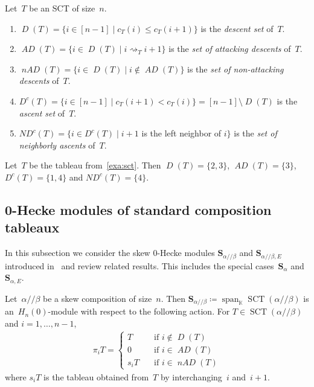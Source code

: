 \documentclass[ALCO,ThmDefs,Unicode,epreuves]{cedram}
\newcommand{\bs}[1]{\boldsymbol{#1} }
\newcommand{\K}{\mathbb K}
\newcommand{\D}{\operatorname{\mathit{D}}}
\newcommand{\DC}{\operatorname{\mathit{D^c}}}
\newcommand{\AD}{\operatorname{\mathit{AD}}}
\newcommand{\nAD}{\operatorname{\mathit{nAD}}}
\newcommand{\ND}{\operatorname{\mathit{ND^c}}}
\DeclareMathOperator{\SCT}{SCT}
\newcommand{\myif}{\quad \text {if }}
\newcommand{\spa}{\operatorname{span}}
\newcommand{\He}{H_n(0)}
\newcommand{\ab}{{\alpha / \! \! / \beta}}
\newcommand{\att}{\rightsquigarrow}
\newcommand{\sa}{\bs S_{\alpha}}
\newcommand{\sab}{\bs S_{\ab}}
\newcommand{\se}{\bs S_{\alpha,E}}
\newcommand{\sse}{\bs S_{\ab,E}}
\begin{document}
\begin{defi}
	\label{thm:descents}
	 Let~$T$ be an SCT of size~$n$.
	\begin{enumerate}
		\item $\D(T) = \{i\in [n-1] \mid c_T(i) \leq c_T(i+1)\}$ is the \emph{descent set} of~$T$.
		\item $\AD(T) = \{i\in \D(T) \mid i\att_T i+1 \}$ is the \emph{set of attacking descents} of~$T$.
		\item $\nAD(T) = \{i\in \D(T) \mid i \notin \AD(T) \}$ is the \emph{set of non-attacking descents} of~$T$.
		\item[(1$'$)] $\DC(T) = \{i\in [n-1] \mid c_T(i+1) < c_T(i)\} = [n-1]\setminus \D(T)$ is the \emph{ascent set} of~$T$.
		\item[(2$'$)] $\ND(T) = \{i\in \DC(T) \mid i+1$ is the left neighbor of $i\}$ is the \emph{set of neighborly ascents} of~$T$.
	\end{enumerate}
\end{defi}

\begin{exam}
Let~$T$ be the tableau from~\cref{exa:sct}. Then
	$\D(T) = \{2,3\}$, 
	$\AD(T) = \{3\}$, 
	$\DC(T) =\{1,4\}$ and
	$\ND(T) = \{4\}$. 
\end{exam}


\subsection{0-Hecke modules of standard composition tableaux}

In this subsection we consider the skew 0-Hecke modules $\sab$ and $\sse$ introduced in~\cite{Tewari2015} and review related results. This includes the special cases~$\sa$ and~$\se$.

\begin{thm}
	\label{thm:sct_modules}
	Let~$\ab$ be a skew composition of size~$n$. 
	Then $\sab\coloneqq \spa_\K \SCT(\ab)$ is an~$\He$-module with respect to the following action. For $T\in \SCT(\ab)$ and $i=1,\dots, n-1$,
	\begin{align*}
	\pi_i T = 
	\begin{cases}
	T &\myif i \notin \D(T) \\
	0 &\myif i \in \AD(T) \\ 
	s_iT &\myif i \in \nAD(T) 
	\end{cases}
	\end{align*}
	where $s_iT$ is the tableau obtained from~$T$ by interchanging~$i$ and~$i+1$.
\end{thm}
\end{document}
